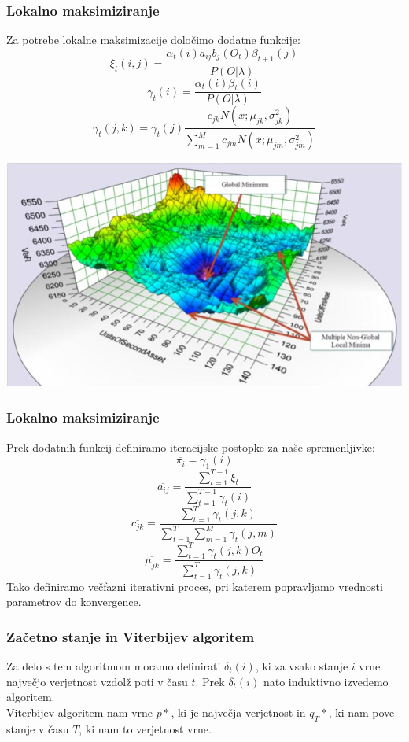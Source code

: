 \documentclass{beamer} %
\begin{document}
\begin{frame}
\frametitle{Lokalno maksimiziranje}
Za potrebe lokalne maksimizacije določimo dodatne funkcije:
$$\xi_{t}(i,j) = \frac{\alpha_{t}(i)a_{ij}b_{j}(O_{t})\beta_{t+1}(j)}{P(O|\lambda)}$$
$$\gamma_{t}(i) = \frac{\alpha_{t}(i)\beta_{t}(i)}{P(O|\lambda)}$$
$$ \gamma_{t}(j,k) =\gamma_{t}(j)\frac{c_{jk} N(x;\mu_{jk}, \sigma_{jk}^2)}{\sum_{m = 1}^{M}{c_{jm}} N(x;\mu_{jm}, \sigma_{jm}^2)}$$
\begin{center}
	\includegraphics[scale=0.25]{slike/gore}
\end{center}
\end{frame}

\begin{frame}
\frametitle{Lokalno maksimiziranje}
Prek dodatnih funkcij definiramo iteracijske postopke za naše spremenljivke:
$$ \overline{\pi_{i}} = \gamma_{1}(i)$$
$$ \overline{a_{ij}} = \frac{\sum_{t=1}^{T-1}{\xi_{t}}}{\sum_{t=1}^{T-1}{\gamma_{t}(i)}}$$
$$\overline{c_{jk}}= \frac{\sum_{t=1}^{T}{\gamma_{t}(j,k)}}{\sum_{t=1}^{T}\sum_{m=1}^{M}{\gamma_{t}(j,m)}}$$
$$\overline{\mu_{jk}}=\frac{\sum_{t=1}^{T}{\gamma_{t}(j,k)}O_{t}}{\sum_{t=1}^{T}{\gamma_{t}(j,k)}}$$
Tako definiramo večfazni iterativni proces, pri katerem popravljamo vrednosti parametrov do konvergence.
\end{frame}
\begin{frame}
\frametitle{Začetno stanje in Viterbijev algoritem}
Za delo s tem algoritmom moramo definirati $\delta_{t}(i)$, ki za vsako stanje $i$ vrne največjo verjetnost vzdolž poti v času $t$. Prek $\delta_{t}(i)$ nato induktivno izvedemo algoritem.\\
Viterbijev algoritem nam vrne $p*$, ki je največja verjetnost in $q_{T}*$, ki nam pove stanje v času $T$, ki nam to verjetnost vrne.
\end{frame}
\end{document}
